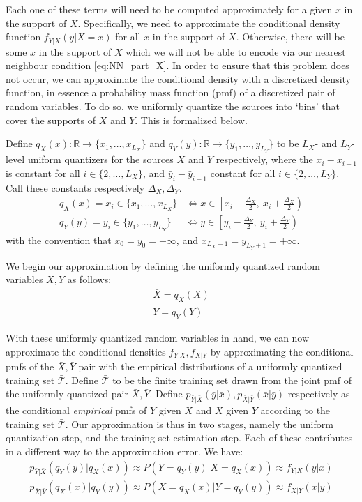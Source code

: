 Each one of these terms will need to be computed approximately for a given $x$ in the support of $X$. Specifically, we need to approximate the conditional density function $f_{Y|X}(y|X=x)$ for all $x$ in the support of $X$. Otherwise, there will be some $x$ in the support of $X$ which we will not be able to encode via our nearest neighbour condition \eqref{eq:NN_part_X}. In order to ensure that this problem does not occur, we can approximate the conditional density with a discretized density function, in essence a probability mass function (pmf) of a discretized pair of random variables. To do so, we uniformly quantize the sources into `bins' that cover the supports of $X$ and $Y$. This is formalized below.

Define
$q_X(x):\mathbb{R} \rightarrow \{\bar x_1,\ldots,\bar x_{L_X}\}$
and
$q_Y(y):\mathbb{R} \rightarrow \{\bar y_1,\ldots,\bar y_{L_Y}\}$
to be $L_X$- and $L_Y$-level uniform quantizers for the sources $X$ and $Y$ respectively, where the $\bar x_i-\bar x_{i-1}$ is constant for all $i\in \{2,\ldots,L_X\}$, and $\bar y_i-\bar y_{i-1}$ constant for all $i\in \{2,\ldots,L_Y\}$. Call these constants respectively $\Delta_X, \Delta_Y$.
\begin{align}
    q_X(x) = \bar x_i \in \{\bar x_1,\ldots,\bar x_{L_X}\} &\iff x \in  \left[\bar x_{i}-\frac{\Delta_X}{2},\ \bar x_i+\frac{\Delta_X}{2}\right)\\
    q_Y(y) = \bar y_i \in \{\bar y_1,\ldots,\bar y_{L_Y}\} &\iff y \in  \left[\bar y_{i}-\frac{\Delta_Y}{2},\ \bar y_i+\frac{\Delta_Y}{2}\right)
\end{align}
with the convention that $\bar x_{0}=\bar y_{0}=-\infty$, and $\bar x_{L_X+1}=\bar y_{L_Y+1}=+\infty$.

We begin our approximation by defining the uniformly quantized random variables $\bar X, \bar Y$ as follows:
\begin{align}
    \bar X = q_X(X)\\
    \bar Y = q_Y(Y)
\end{align}

With these uniformly quantized random variables in hand, we can now approximate the conditional densities $f_{Y|X}, f_{X|Y}$ by approximating the conditional pmfs of the $\bar X, \bar Y$ pair with the empirical distributions of a uniformly quantized training set $\mathcal{\bar T}$. Define $\mathcal{\bar T}$ to be the finite training set drawn from the joint pmf of the uniformly quantized pair $\bar X, \bar Y$. Define $p_{\bar Y|\bar X}(\bar y|\bar x),p_{\bar X|\bar Y}(\bar x|\bar y)$ respectively as the conditional \emph{empirical} pmfs of $\bar Y$ given $\bar X$ and $\bar X$ given $\bar Y$ according to the training set $\mathcal{\bar T}$. Our approximation is thus in two stages, namely the uniform quantization step, and the training set estimation step. Each of these contributes in a different way to the approximation error. We have:
\begin{align}
    p_{\bar Y|\bar X}(q_Y(y)|q_X(x)) \approx 
        P(\bar Y=q_Y(y) | \bar X=q_X(x)) \approx
            f_{Y|X}(y|x)\\
    p_{\bar X|\bar Y}(q_X(x)|q_Y(y)) \approx 
        P(\bar X=q_X(x) | \bar Y=q_Y(y)) \approx
            f_{X|Y}(x|y)
\end{align}

